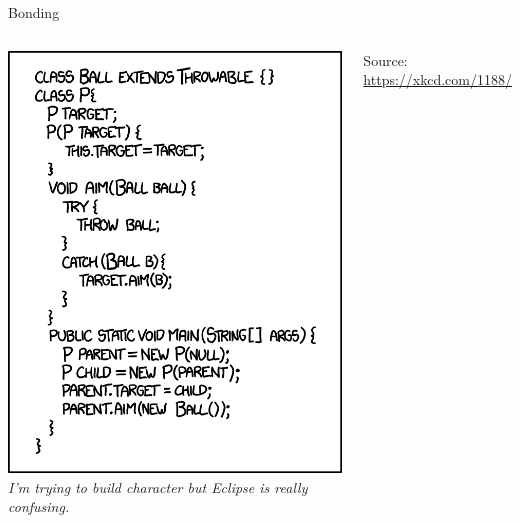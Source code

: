 \begin{frame}{Bonding}
%
\begin{columns}
\includegraphics[width=.8\linewidth]{./gfx/15-xkcd-bonding}
%
\vspace{12pt}
\emph{I'm trying to build character but Eclipse is really confusing.}

\vspace{12pt}
Source: \url{https://xkcd.com/1188/}
\end{columns}
\end{frame}


